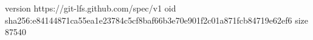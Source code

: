 version https://git-lfs.github.com/spec/v1
oid sha256:e84144871ca55ea1e23784c5cf8baf66b3e70e901f2c01a871fcb84719e62ef6
size 87540
